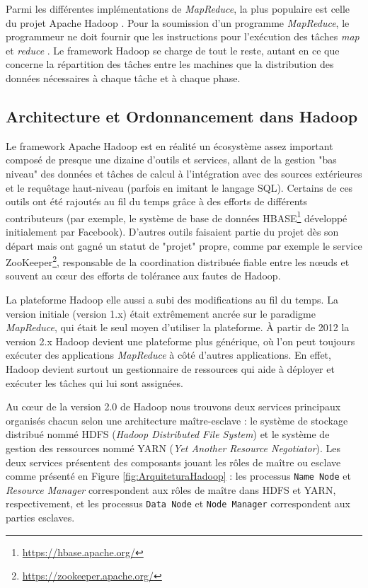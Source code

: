 Parmi les différentes implémentations de \textit{MapReduce}, la plus populaire est celle du projet Apache Hadoop \cite{Hadoop}. Pour la soumission d'un programme \textit{MapReduce}, le programmeur ne doit fournir que les instructions pour l'exécution des tâches \textit{map} et \textit{reduce} \cite{White2010}. Le framework Hadoop se charge de tout le reste, autant en ce que concerne la répartition des tâches entre les machines que la distribution des données nécessaires à chaque tâche et à chaque phase. 


\subsection{Architecture et Ordonnancement dans Hadoop \label{subsec:ordoHadoop}}

Le framework Apache Hadoop est en réalité un écosystème assez important composé de presque une dizaine d'outils et services, allant de la gestion "bas niveau" des données et tâches de calcul à l'intégration avec des sources extérieures et le requêtage haut-niveau (parfois en imitant le langage SQL). Certains de ces outils ont été rajoutés au fil du temps grâce à des efforts de différents contributeurs (par exemple, le système de base de données HBASE\footnote{\url{https://hbase.apache.org/}} développé initialement par Facebook). D'autres outils faisaient partie du projet dès son départ mais ont gagné un statut de "projet" propre, comme par exemple le service ZooKeeper\footnote{\url{https://zookeeper.apache.org/}}, responsable de la coordination distribuée fiable entre les n{\oe}uds et souvent au c{\oe}ur des efforts de tolérance aux fautes de Hadoop.

La plateforme Hadoop elle aussi a subi des modifications au fil du temps. La version initiale (version 1.x) était extrêmement ancrée sur le paradigme \textit{MapReduce}, qui était le seul moyen d'utiliser la plateforme. À partir de 2012 la version 2.x Hadoop devient une plateforme plus générique, où l'on peut toujours exécuter des applications \textit{MapReduce} à côté d'autres applications. En effet, Hadoop devient surtout un gestionnaire de ressources qui aide à déployer et exécuter les tâches qui lui sont assignées.  

Au c{\oe}ur de la version 2.0 de Hadoop nous trouvons deux services principaux organisés chacun selon une architecture maître-esclave : le système de stockage distribué nommé HDFS (\textit{Hadoop Distributed File System}) et le système de gestion des ressources nommé YARN (\textit{Yet Another Resource Negotiator}). Les deux services présentent des composants jouant les rôles de maître ou esclave comme présenté en Figure \ref{fig:ArquiteturaHadoop} : les processus \texttt{Name Node} et \textit{Resource Manager} correspondent aux rôles de maître dans HDFS et YARN, respectivement, et les processus \texttt{Data Node} et \texttt{Node Manager} correspondent aux parties esclaves. 

